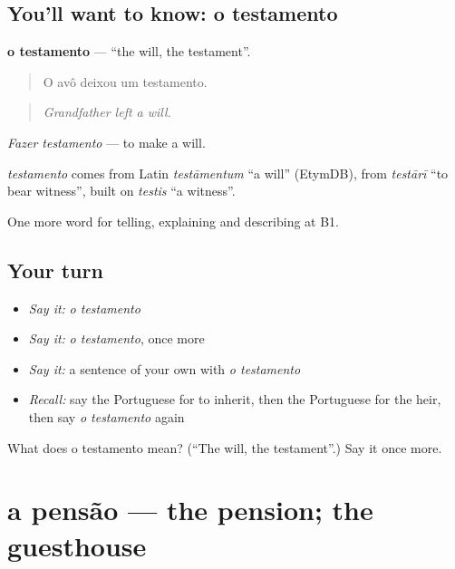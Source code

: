 \subsection*{You'll want to know: o testamento}
\textbf{o testamento} — \textquotedblleft{}the will, the testament\textquotedblright{}.

\begin{quote}
O avô deixou um testamento.
\end{quote}

\begin{quote}
\emph{Grandfather left a will.}
\end{quote}

\emph{Fazer testamento} — to make a will.

\begin{cousinweb}
\emph{testamento} comes from Latin \emph{testāmentum} \textquotedblleft{}a will\textquotedblright{} (EtymDB), from \emph{testārī} \textquotedblleft{}to bear witness\textquotedblright{}, built on \emph{testis} \textquotedblleft{}a witness\textquotedblright{}.
\end{cousinweb}

\begin{grammarlens}[title={What you've built}]
One more word for telling, explaining and describing at B1.
\end{grammarlens}

\subsection*{Your turn}
\begin{itemize}
\raggedright
  \item \emph{Say it:} \emph{o testamento}
  \item \emph{Say it:} \emph{o testamento}, once more
  \item \emph{Say it:} a sentence of your own with \emph{o testamento}
  \item \emph{Recall:} say the Portuguese for to inherit, then the Portuguese for the heir, then say \emph{o testamento} again
\end{itemize}

\begin{tcolorbox}[breakable,colback=teal!4,colframe=teal!35!black,title={Before you move on}]
What does o testamento mean? (\textquotedblleft{}The will, the testament\textquotedblright{}.) Say it once more.
\end{tcolorbox}
\section[a pensão]{a pensão — the pension; the guesthouse}

